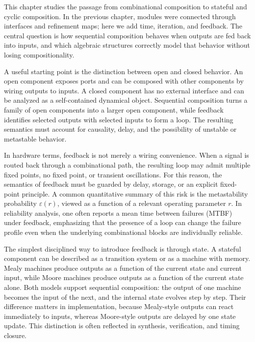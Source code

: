 This chapter studies the passage from combinational composition to stateful and cyclic composition. In the previous chapter, modules were connected through interfaces and refinement maps; here we add time, iteration, and feedback. The central question is how sequential composition behaves when outputs are fed back into inputs, and which algebraic structures correctly model that behavior without losing compositionality.

A useful starting point is the distinction between open and closed behavior. An open component exposes ports and can be composed with other components by wiring outputs to inputs. A closed component has no external interface and can be analyzed as a self-contained dynamical object. Sequential composition turns a family of open components into a larger open component, while feedback identifies selected outputs with selected inputs to form a loop. The resulting semantics must account for causality, delay, and the possibility of unstable or metastable behavior.

In hardware terms, feedback is not merely a wiring convenience. When a signal is routed back through a combinational path, the resulting loop may admit multiple fixed points, no fixed point, or transient oscillations. For this reason, the semantics of feedback must be guarded by delay, storage, or an explicit fixed-point principle. A common quantitative summary of this risk is the metastability probability \(\varepsilon(r)\), viewed as a function of a relevant operating parameter \(r\). In reliability analysis, one often reports a mean time between failures (MTBF) under feedback, emphasizing that the presence of a loop can change the failure profile even when the underlying combinational blocks are individually reliable.

The simplest disciplined way to introduce feedback is through state. A stateful component can be described as a transition system or as a machine with memory. Mealy machines produce outputs as a function of the current state and current input, while Moore machines produce outputs as a function of the current state alone. Both models support sequential composition: the output of one machine becomes the input of the next, and the internal state evolves step by step. Their difference matters in implementation, because Mealy-style outputs can react immediately to inputs, whereas Moore-style outputs are delayed by one state update. This distinction is often reflected in synthesis, verification, and timing closure.

